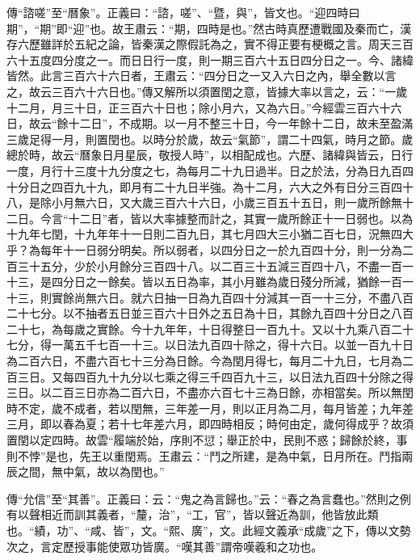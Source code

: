 {\noindent\zhuan{}\fzbyks 傳“諮嗟”至“曆象”。正義曰：“諮，嗟”、“暨，與”，皆文也。“迎四時曰期”，“期”即“迎”也。故王肅云：“期，四時是也。”然古時真歷遭戰國及秦而亡，漢存六歷雖詳於五紀之論，皆秦漢之際假託為之，實不得正要有梗概之言。周天三百六十五度四分度之一。而日日行一度，則一期三百六十五日四分日之一。今、諸緯皆然。此言三百六十六日者，王肅云：“四分日之一又入六日之內，舉全數以言之，故云三百六十六日也。”傳又解所以須置閏之意，皆據大率以言之，云：“一歲十二月，月三十日，正三百六十日也；除小月六，又為六日。”今經雲三百六十六日，故云“餘十二日”，不成期。以一月不整三十日，今一年餘十二日，故未至盈滿三歲足得一月，則置閏也。以時分於歲，故云“氣節”，謂二十四氣，時月之節。歲總於時，故云“曆象日月星辰，敬授人時”，以相配成也。六歷、諸緯與皆云，日行一度，月行十三度十九分度之七，為每月二十九日過半。日之於法，分為日九百四十分日之四百九十九，即月有二十九日半強。為十二月，六大之外有日分三百四十八，是除小月無六日，又大歲三百六十六日，小歲三百五十五日，則一歲所餘無十二日。今言“十二日”者，皆以大率據整而計之，其實一歲所餘正十一日弱也。以為十九年七閏，十九年年十一日則二百九日，其七月四大三小猶二百七日，況無四大乎？為每年十一日弱分明矣。所以弱者，以四分日之一於九百四十分，則一分為二百三十五分，少於小月餘分三百四十八。以二百三十五減三百四十八，不盡一百一十三，是四分日之一餘矣。皆以五日為率，其小月雖為歲日殘分所減，猶餘一百一十三，則實餘尚無六日。就六日抽一日為九百四十分減其一百一十三分，不盡八百二十七分。以不抽者五日並三百六十日外之五日為十日，其餘九百四十分日之八百二十七，為每歲之實餘。今十九年年，十日得整日一百九十。又以十九乘八百二十七分，得一萬五千七百一十三。以日法九百四十除之，得十六日。以並一百九十日為二百六日，不盡六百七十三分為日餘。今為閏月得七，每月二十九日，七月為二百三日。又每四百九十九分以七乘之得三千四百九十三，以日法九百四十分除之得三日。以二百三日亦為二百六日，不盡亦六百七十三為日餘，亦相當矣。所以無閏時不定，歲不成者，若以閏無，三年差一月，則以正月為二月，每月皆差；九年差三月，即以春為夏；若十七年差六月，即四時相反；時何由定，歲何得成乎？故須置閏以定四時。故雲“履端於始，序則不愆；舉正於中，民則不惑；歸餘於終，事則不悖”是也，先王以重閏焉。王肅云：“鬥之所建，是為中氣，日月所在。鬥指兩辰之間，無中氣，故以為閏也。” \par}

{\noindent\zhuan{}\fzbyks 傳“允信”至“其善”。正義曰：云：“鬼之為言歸也。”云：“春之為言蠢也。”然則之例有以聲相近而訓其義者，“釐，治”，“工，官”，皆以聲近為訓，他皆放此類也。“績，功”、“咸、皆”，文。“熙、廣”，文。此經文義承“成歲”之下，傳以文勢次之，言定歷授事能使眾功皆廣。“嘆其善”謂帝嘆羲和之功也。 \par}

